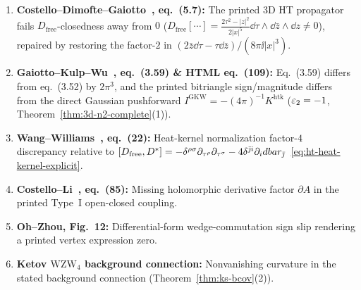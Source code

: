 \begin{enumerate}[label=\textbf{Erratum~\arabic*.},leftmargin=*]
  \item \textbf{Costello--Dimofte--Gaiotto~\cite{CDG20}, eq.~(5.7):} The printed $3\mathrm{D}$ HT propagator fails $D_{\mathrm{free}}$-closedness away from $0$ ($D_{\mathrm{free}}[\cdots] = \frac{2\tau^2-|z|^2}{2|x|^5}\dd\tau\wedge\dd\bar{z}\wedge\dd z \neq 0$), repaired by restoring the factor-$2$ in $(2\bar{z}\dd\tau - \tau\dd\bar{z})/(8\pi\ii|x|^3)$.

  \item \textbf{Gaiotto--Kulp--Wu~\cite{GKW}, eq.~(3.59) \& HTML eq.~(109):} Eq.~(3.59) differs from eq.~(3.52) by $2\pi^3$, and the printed bitriangle sign/magnitude differs from the direct Gaussian pushforward $I^{\mathrm{GKW}} = -(4\pi)^{-1}K^{\mathrm{htk}}$ ($\varepsilon_2 = -1$, Theorem~\ref{thm:3d-n2-complete}(1)).

  \item \textbf{Wang--Williams~\cite{WW24}, eq.~(22):} Heat-kernel normalization factor-$4$ discrepancy relative to $[D_{\mathrm{free}}, D^*] = -\delta^{\rho\sigma}\partial_{\tau^\rho}\partial_{\tau^\sigma} - 4\delta^{\bar{\jmath}i}\partial_idbar_{\bar{\jmath}}$~\eqref{eq:ht-heat-kernel-explicit}.

  \item \textbf{Costello--Li~\cite{CL19}, eq.~(85):} Missing holomorphic derivative factor $\partial A$ in the printed Type~I open-closed coupling.

  \item \textbf{Oh--Zhou, Fig.~12:} Differential-form wedge-commutation sign slip rendering a printed vertex expression zero.

  \item \textbf{Ketov $\mathrm{WZW}_4$ background connection:} Nonvanishing curvature in the stated background connection (Theorem~\ref{thm:ks-bcov}(2)).
\end{enumerate}
